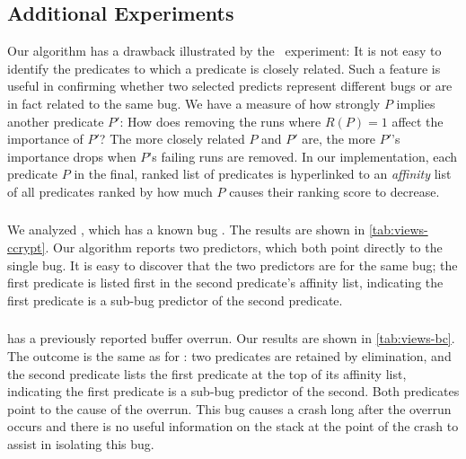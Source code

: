 \subsection{Additional Experiments}

Our algorithm has a drawback illustrated by the \moss\ experiment: It
is not easy to identify the predicates to which a predicate is closely
related.  Such a feature is useful in confirming whether two selected
predicts represent different bugs or are in fact related to the same
bug.  We have a measure of how strongly $P$ implies another predicate
$P'$: How does removing the runs where $R(P) = 1$ affect the
importance of $P'$?  The more closely related $P$ and $P'$ are, the
more $P'$'s importance drops when $P$'s failing runs are removed.  In
our implementation, each predicate $P$ in the final, ranked list of
predicates is hyperlinked to an {\em affinity} list of all predicates
ranked by how much $P$ causes their ranking score to decrease.



\subsubsection{\ccrypt}

We analyzed , which has a known bug \cite{Selinger:2003:cqual}.  
The results are shown in \autoref{tab:views-ccrypt}.
Our algorithm reports two predictors, which both point directly to the single bug. 
It is easy to discover that the two predictors are for the same bug; the first predicate
is listed first in the second predicate's affinity list, indicating the first predicate
is a sub-bug predictor of the second predicate.

\subsubsection{\bc}

 has a previously reported buffer overrun.  Our results are shown in \autoref{tab:views-bc}.
The outcome is the same as for \ccrypt: two predicates are retained by elimination, and the second
predicate lists the first predicate at the top of its affinity list, indicating the first predicate
is a sub-bug predictor of the second.  Both predicates point to the cause of the overrun.  
This bug causes a crash long after the overrun occurs and there is no useful
information on the stack at the point of the crash to assist in isolating this bug.

